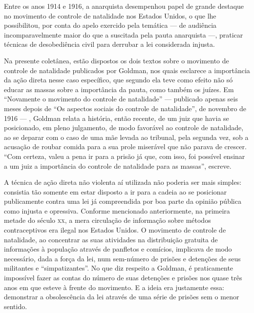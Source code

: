 Entre os anos 1914 e 1916, a anarquista desempenhou papel de grande
destaque no movimento de controle de natalidade nos Estados Unidos, o
que lhe possibilitou, por conta do apelo exercido pela temática --- de
audiência incomparavelmente maior do que a suscitada pela pauta
anarquista ---, praticar técnicas de desobediência civil para
derrubar a lei considerada injusta.

Na presente coletânea, estão
dispostos os dois textos sobre o movimento de controle de natalidade
publicados por Goldman, nos quais esclarece a importância da ação
direta nesse caso específico, que segundo ela teve como efeito não só
educar as massas sobre a importância da pauta, como também os juízes. Em
``Novamente o movimento do controle de natalidade'' --- publicado apenas
seis meses depois de ``Os aspectos sociais do controle de natalidade'', de
novembro de 1916 --- , Goldman relata a história, então recente, de um
juiz que havia se posicionado, em pleno julgamento, de modo favorável ao
controle de natalidade, ao se deparar com o caso de uma mãe levada ao
tribunal, pela segunda vez, sob a acusação de roubar comida para a sua
prole miserável que não parava de crescer. ``Com certeza, valeu a pena
ir para a prisão já que, com isso, foi possível ensinar a um juiz a
importância do controle de natalidade para as massas'', escreve.

A técnica de ação direta não violenta aí utilizada não
poderia ser mais simples: consistia tão somente em estar disposto a ir
para a cadeia ao se posicionar publicamente contra uma lei já
compreendida por boa parte da opinião pública como injusta e opressiva.
Conforme mencionado anteriormente, na primeira metade do século \textsc{xx}, a
mera circulação de informação sobre métodos contraceptivos era
ilegal nos Estados Unidos. O movimento de controle de
natalidade, ao concentrar as suas atividades na distribuição gratuita de
informações à população através de panfletos e comícios, implicava de
modo necessário, dada a força da lei, num sem-número de prisões e
detenções de seus militantes e ``simpatizantes''. No que diz
respeito a Goldman, é praticamente impossível fazer as contas do número
de suas detenções e prisões nos quase três anos em que esteve à frente
do movimento. E a ideia era justamente essa: demonstrar a obsolescência
da lei através de uma série de prisões sem o menor sentido.

